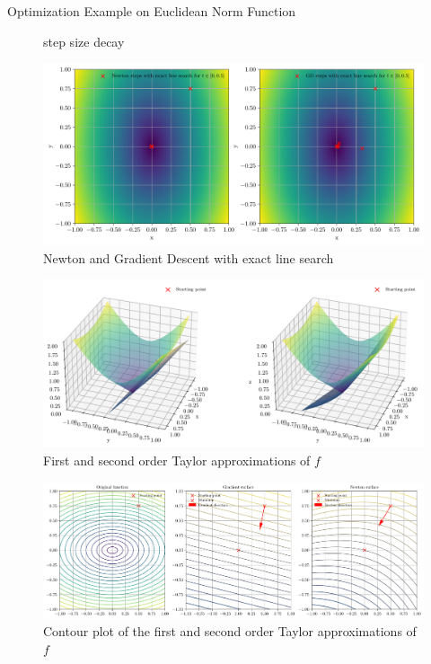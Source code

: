 \documentclass{beamer}
\begin{document}
\begin{frame}{Optimization Example on Euclidean Norm Function}
{\begin{figure}
{                step size decay}
            \label{fig:gd_steps}
        \end{figure}
    }
     {
        \begin{figure}
            \centering
            \includegraphics[width=1.0\textwidth]{plots/exact_line_search_newton_vs_gd.pdf}
            \caption{Newton and Gradient Descent
                with exact line search}
            \label{fig:newton_gd_exact_line_search}
        \end{figure}
    }
     {
        \begin{figure}
            \centering
            \includegraphics[width=1.0\textwidth]{plots/3d_newton_and_gradient_surface.pdf}
            \caption{First and second order Taylor approximations
                of $f$}
            \label{fig:3d_newton_gradient_surface}
        \end{figure}
    }
     {
        \begin{figure}
            \centering
            \includegraphics[width=1.0\textwidth]{plots/contour_newton_and_gradient_surface.pdf}
            \caption{Contour plot of the first and second order
                Taylor approximations of $f$}
            \label{fig:contour_newton_gradient_surface}
        \end{figure}
    }
\end{frame}
\end{document}
